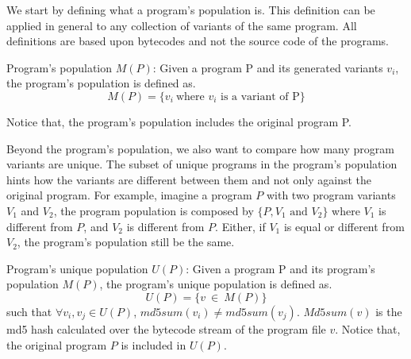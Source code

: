 We start by defining what a program's population is. This definition can be applied in general to any collection of variants of the same program. All definitions are based upon bytecodes and not the source code of the programs.

\begin{definition}{Program's population $M(P)$:}\label{def:rq1:programspopulation}
    \normalfont 
    Given a program P and its generated variants $v_i$, the program's population is defined as.\\
    $$
        M(P)=\{v_i\ \text{where $v_i$ is a variant of P}\}
    $$

    Notice that, the program's population includes the original program P.
\end{definition}

Beyond the program's population, we also want to compare how many program variants are unique. The subset of unique programs in the program's population hints how the variants are different between them and not only against the original program. For example, imagine a program $P$ with two program variants $V_1$ and $V_2$, the program population is composed by $\{P, V_1 \text{ and } V_2\}$ where $V_1$ is different from $P$, and $V_2$ is different from $P$. Either, if $V_1$ is equal or different from $V_2$, the program's population still be the same.






\begin{definition}{Program's unique population $U(P)$:}\label{def:rq1:programsuniquepopulation}
    \normalfont 
    Given a program P and its program's population $M(P)$, the program's unique population is defined as.\\
    $$
        U(P)=\{v\ \in\ M(P)\}
    $$
    such that $\forall v_i,v_j \in U(P)$, $md5sum(v_i) \neq md5sum(v_j)$.
    $Md5sum(v)$ is the md5 hash calculated over the bytecode stream of the program file $v$. Notice that, the original program $P$ is included in $U(P)$.

\end{definition}

